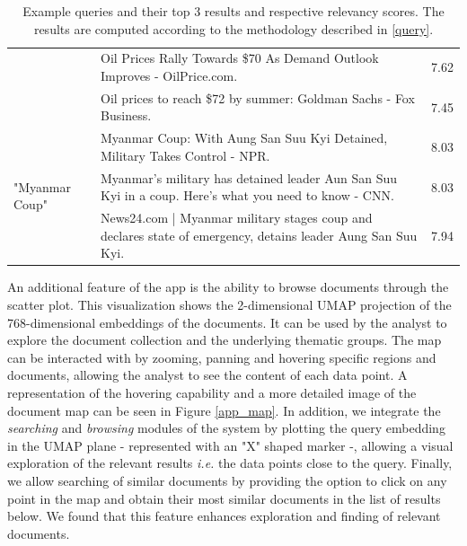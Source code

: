 \documentclass[a4paper]{article}
\begin{document}
\begin{table}[H]
{\begin{tabularx}{\linewidth}{lXl}
                                                & Oil Prices Rally Towards \$70 As Demand Outlook Improves - OilPrice.com.                                       & 7.62            \\
                                                & Oil prices to reach \$72 by summer: Goldman Sachs - Fox Business.                                              & 7.45            \\  \midrule
      \multirow{3}{*}{"Myanmar Coup"}           & Myanmar Coup: With Aung San Suu Kyi Detained, Military Takes Control - NPR.                                    & 8.03            \\
                                                & Myanmar's military has detained leader Aun San Suu Kyi in a coup. Here's what you need to know - CNN.          & 8.03            \\
                                                & News24.com | Myanmar military stages coup and declares state of emergency, detains leader Aung San Suu Kyi.    & 7.94            \\  \bottomrule
    \end{tabularx}%
  }
  \caption{Example queries and their top 3 results and respective relevancy scores. The results are computed according to the methodology described in \ref{query}.}
  \label{query_results}
\end{table}

An additional feature of the app is the ability to browse documents through the scatter plot. This visualization shows the 2-dimensional UMAP projection of the 768-dimensional embeddings of the documents. It can be used by the analyst to explore the document collection and the underlying thematic groups. The map can be interacted with by zooming, panning and hovering specific regions and documents, allowing the analyst to see the content of each data point. A representation of the hovering capability and a more detailed image of the document map can be seen in Figure \ref{app_map}. In addition, we integrate the \emph{searching} and \emph{browsing} modules of the system by plotting the query embedding in the UMAP plane - represented with an "X" shaped marker -, allowing a visual exploration of the relevant results \emph{i.e.} the data points close to the query. Finally, we allow searching of similar documents by providing the option to click on any point in the map and obtain their most similar documents in the list of results below. We found that this feature enhances exploration and finding of relevant documents.
\end{document}
